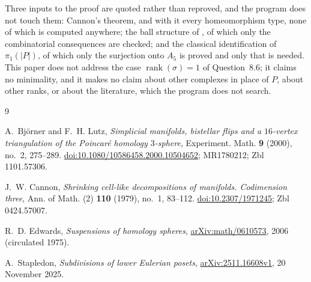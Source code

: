 \documentclass[11pt]{amsart}
\theoremstyle{definition}
\theoremstyle{remark}
\DeclareMathOperator{\rank}{rank}
\begin{document}
Three inputs to the proof are quoted rather than reproved, and the program does not touch
them: Cannon's theorem, and with it every homeomorphism type, none of which is computed
anywhere; the ball structure of \cite[Example 7.10]{Stapledon}, of which only the
combinatorial consequences are checked; and the classical identification of $\pi_1(|P|)$,
of which only the surjection onto $A_5$ is proved and only that is needed. This paper does
not address the case $\rank(\sigma)=1$ of Question~8.6; it claims no minimality, and it
makes no claim about other complexes in place of $P$, about other ranks, or about the
literature, which the program does not search.

\begin{thebibliography}{9}

A.~Bj\"orner and F.~H. Lutz,
\emph{Simplicial manifolds, bistellar flips and a $16$-vertex triangulation of the
Poincar\'e homology $3$-sphere},
Experiment. Math. \textbf{9} (2000), no.~2, 275--289.
\href{https://doi.org/10.1080/10586458.2000.10504652}{doi:10.1080/10586458.2000.10504652};
MR1780212; Zbl 1101.57306.

J.~W. Cannon,
\emph{Shrinking cell-like decompositions of manifolds. Codimension three},
Ann. of Math. (2) \textbf{110} (1979), no.~1, 83--112.
\href{https://doi.org/10.2307/1971245}{doi:10.2307/1971245}; Zbl 0424.57007.

R.~D. Edwards,
\emph{Suspensions of homology spheres},
\href{https://arxiv.org/abs/math/0610573}{arXiv:math/0610573}, 2006 (circulated 1975).

A.~Stapledon,
\emph{Subdivisions of lower Eulerian posets},
\href{https://arxiv.org/abs/2511.16608v1}{arXiv:2511.16608v1}, 20 November 2025.

\end{thebibliography}
\end{document}
